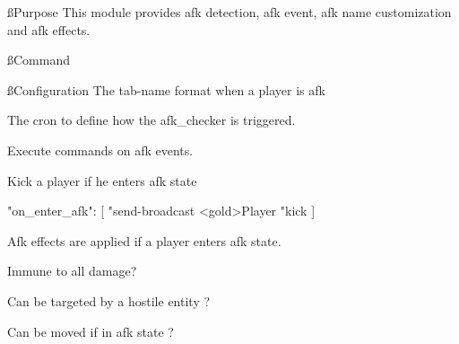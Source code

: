
\ss{Purpose}
This module provides afk detection, afk event, afk name customization and afk effects.

\ss{Command}

\ss{Configuration}
The tab-name format when a player is afk

The cron to define how the afk\_checker is triggered.

Execute commands on afk events.

\begin{example}{Kick a player if he enters afk state}
    \begin{json}
        "on_enter_afk": [
        "send-broadcast <gold>Player %
        "kick %
        ]
    \end{json}
\end{example}

Afk effects are applied if a player enters afk state.

Immune to all damage?

Can be targeted by a hostile entity ?

Can be moved if in afk state ?












